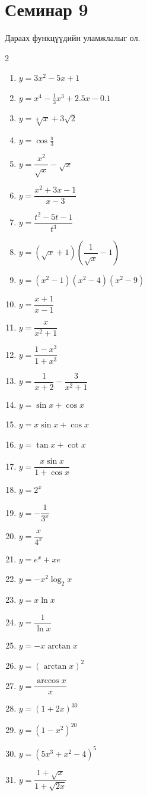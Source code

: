 \section{Семинар 9}
Дараах функцүүдийн уламжлалыг ол.
\begin{multicols}{2}
\begin{enumerate}
  \item $y = 3x^2 - 5x + 1$
  \item $y = x^4 - \tfrac{1}{3}x^3 + 2.5x - 0.1$
  \item $y = \sqrt[3]{x} + 3\sqrt{2}$
  \item $y = \cos \tfrac{\pi}{3}$
  \item $y = \dfrac{x^2}{\sqrt{x}} - \sqrt{x}$
  \item $y = \dfrac{x^2 + 3x - 1}{x - 3}$
  \item $y = \dfrac{t^2 - 5t - 1}{t^3}$
  \item $y = (\sqrt{x} + 1)\left(\dfrac{1}{\sqrt{x}} - 1\right)$
  \item $y = (x^2 - 1)(x^2 - 4)(x^2 - 9)$
  \item $y = \dfrac{x + 1}{x - 1}$
  \item $y = \dfrac{x}{x^2 + 1}$
  \item $y = \dfrac{1 - x^3}{1 + x^3}$
  \item $y = \dfrac{1}{x + 2} - \dfrac{3}{x^2 + 1}$
  \item $y = \sin x + \cos x$
  \item $y = x \sin x + \cos x$
  \item $y = \tan x + \cot x$
  \item $y = \dfrac{x \sin x}{1 + \cos x}$
  \item $y = 2^x$
  \item $y = -\dfrac{1}{3^x}$
  \item $y = \dfrac{x}{4^x}$
  \item $y = e^x + x e$
  \item $y = -x^2 \log_2 x$
  \item $y = x \ln x$
  \item $y = \dfrac{1}{\ln x}$
  \item $y = -x \arctan x$
  \item $y = (\arctan x)^2$
  \item $y = \dfrac{\arccos x}{x}$
  \item $y = (1 + 2x)^{30}$
  \item $y = (1 - x^2)^{20}$
  \item $y = (5x^3 + x^2 - 4)^5$
  \item $y = \dfrac{1 + \sqrt{x}}{1 + \sqrt{2x}}$

\end{enumerate}
\end{multicols}
